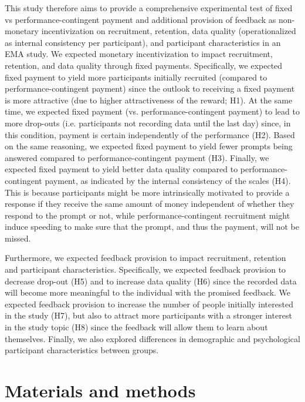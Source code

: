 \documentclass[authordate, empirical]{jote-new-article}
\begin{document}
	This study therefore aims to provide a comprehensive experimental test of fixed vs performance-contingent payment and additional provision of feedback as non-monetary incentivization on recruitment, retention, data quality (operationalized as internal consistency per participant), and participant characteristics in an EMA study. We expected monetary incentivization to impact recruitment, retention, and data quality through fixed payments. Specifically, we expected fixed payment to yield more participants initially recruited (compared to performance-contingent payment) since the outlook to receiving a fixed payment is more attractive (due to higher attractiveness of the reward; H1). At the same time, we expected fixed payment (vs. performance-contingent payment) to lead to more drop-outs (i.e. participants not recording data until the last day) since, in this condition, payment is certain independently of the performance (H2). Based on the same reasoning, we expected fixed payment to yield fewer prompts being answered compared to performance-contingent payment (H3). Finally, we expected fixed payment to yield better data quality compared to performance-contingent payment, as indicated by the internal consistency of the scales (H4). This is because participants might be more intrinsically motivated to provide a response if they receive the same amount of money independent of whether they respond to the prompt or not, while performance-contingent recruitment might induce speeding to make sure that the prompt, and thus the payment, will not be missed.



	Furthermore, we expected feedback provision to impact recruitment, retention and participant characteristics. Specifically, we expected feedback provision to decrease drop-out (H5) and to increase data quality (H6) since the recorded data will become more meaningful to the individual with the promised feedback. We expected feedback provision to increase the number of people initially interested in the study (H7), but also to attract more participants with a stronger interest in the study topic (H8) since the feedback will allow them to learn about themselves. Finally, we also explored differences in demographic and psychological participant characteristics between groups.



	\section{\textbf{Materials and methods}}
\end{document}
